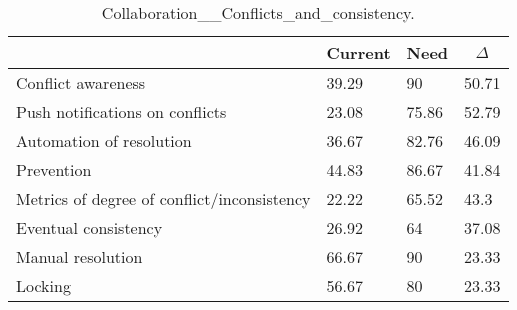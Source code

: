 
  \begin{table*}[]
  \centering
  \notsotiny
  \caption{ Collaboration__Conflicts_and_consistency.}
\label{tab:collaboration__conflicts_and_consistency}
\begin{tabular}{|l|l|l|l|}
  \hline
  \rowcolor[HTML]{C0C0C0}
    \multicolumn{1}{|c|}{Feature} & \multicolumn{1}{c|}{Current} & \multicolumn{1}{c|}{Need} & \multicolumn{1}{c|}{$\Delta$} \\ \hline
  Conflict awareness & 39.29 & 90 & 50.71 \\ \hline 
Push notifications on conflicts & 23.08 & 75.86 & 52.79 \\ \hline 
Automation of resolution & 36.67 & 82.76 & 46.09 \\ \hline 
Prevention & 44.83 & 86.67 & 41.84 \\ \hline 
Metrics of degree of conflict/inconsistency & 22.22 & 65.52 & 43.3 \\ \hline 
Eventual consistency & 26.92 & 64 & 37.08 \\ \hline 
Manual resolution & 66.67 & 90 & 23.33 \\ \hline 
Locking & 56.67 & 80 & 23.33 \\ \hline 
\end{tabular}%
  \end{table*}